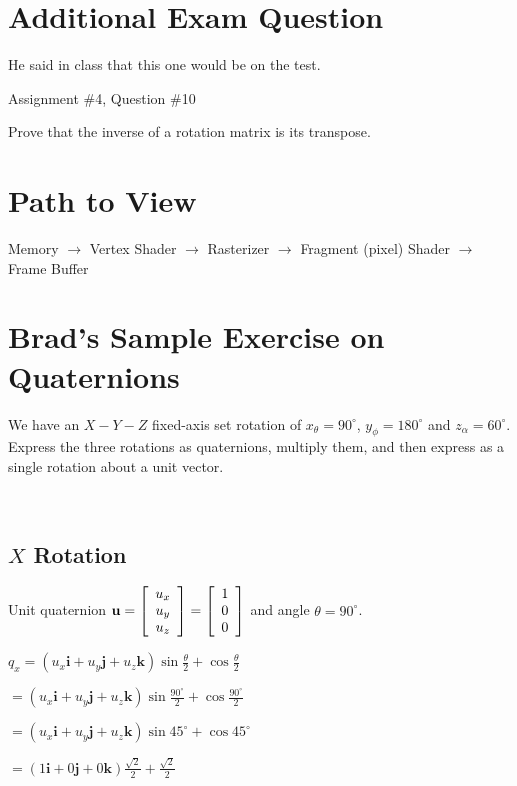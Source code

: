 \documentclass[11pt]{article}
\begin{document}
\begin{spacing}{1.2}
\section{Additional Exam Question}

He said in class that this one would be on the test.  

Assignment \#4, Question \#10

Prove that the inverse of a rotation matrix is its transpose.  

\section{Path to View}

Memory $\to$ Vertex Shader $\to$ Rasterizer $\to$ Fragment (pixel) Shader $\to$ Frame Buffer

\section{Brad's Sample Exercise on Quaternions}

We have an $X-Y-Z$ fixed-axis set rotation of $x_{\theta} = 90^{\circ}$, $y_{\phi} = 180^{\circ}$ and $z_{\alpha} = 60^{\circ}$.  Express the three rotations as quaternions, multiply them, and then express as a single rotation about a unit vector.

\

\subsection{$X$ Rotation}

Unit quaternion 
$\displaystyle 
\mathbf{u} = 
\left[
	\begin{array}{c}
		u_x \cr u_y \cr u_z \cr
	\end{array}
\right]
= 
\left[
	\begin{array}{c}
		1 \cr 0 \cr 0 \cr
	\end{array}
\right]
$
and angle $\theta = 90^{\circ}$.

$q_x
 = (u_x \mathbf{i} + u_y \mathbf{j} + u_z \mathbf{k}) \sin \frac{\theta}{2} + \cos \frac{\theta}{2}
 $
 
 $ = (u_x \mathbf{i} + u_y \mathbf{j} + u_z \mathbf{k}) \sin \frac{90^{\circ}}{2} + \cos \frac{90^{\circ}}{2}$

 $ = (u_x \mathbf{i} + u_y \mathbf{j} + u_z \mathbf{k}) \sin 45^{\circ} + \cos 45^{\circ}$

 $ = (1 \mathbf{i} + 0\mathbf{j} + 0\mathbf{k}) \frac{\sqrt2}{2} + \frac{\sqrt2}{2}$


\end{spacing}
\end{document}
